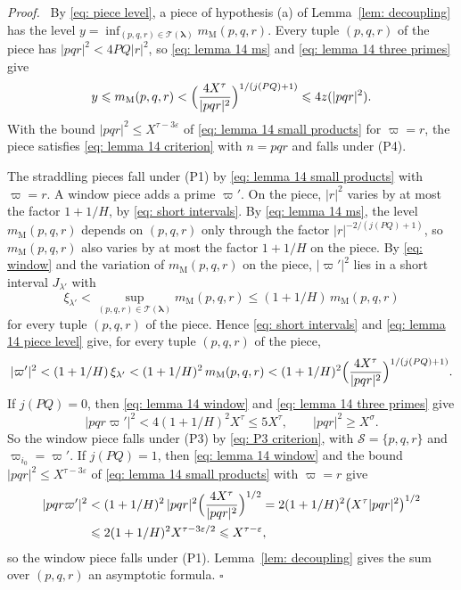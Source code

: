 \documentclass{article}
\numberwithin{equation}{section}
\newenvironment{proof}[1][Proof]{\par\medskip\noindent\textit{#1.}\ }{\hfill$\square$\par\medskip}
\newcommand{\Le}{\leqslant}
\newcommand{\Ge}{\geqslant}
\begin{document}
\begin{proof}
By \eqref{eq: piece level}, a piece of hypothesis (a) of Lemma~\ref{lem: decoupling} has the level $y = \inf_{(p, q, r) \in \mathcal{T}(\boldsymbol{\lambda})} m_{\mathrm{M}}(p, q, r)$. Every tuple $(p, q, r)$ of the piece has $|pqr|^2 < 4PQ|r|^2$, so \eqref{eq: lemma 14 ms} and \eqref{eq: lemma 14 three primes} give
\begin{equation}
\label{eq: lemma 14 piece level}
y \Le m_{\mathrm{M}}(p, q, r) < \Bigl( \frac{4X^{\tau}}{|pqr|^2} \Bigr)^{1/(j(PQ)+1)} \Le 4z(|pqr|^2).
\end{equation}
With the bound $|pqr|^2 \Le X^{\tau - 3\varepsilon}$ of \eqref{eq: lemma 14 small products} for $\varpi = r$, the piece satisfies \eqref{eq: lemma 14 criterion} with $n = pqr$ and falls under (P4).

The straddling pieces fall under (P1) by \eqref{eq: lemma 14 small products} with $\varpi = r$. A window piece adds a prime $\varpi'$. On the piece, $|r|^2$ varies by at most the factor $1 + 1/H$, by \eqref{eq: short intervals}. By \eqref{eq: lemma 14 ms}, the level $m_{\mathrm{M}}(p, q, r)$ depends on $(p, q, r)$ only through the factor $|r|^{-2/(j(PQ)+1)}$, so $m_{\mathrm{M}}(p, q, r)$ also varies by at most the factor $1 + 1/H$ on the piece. By \eqref{eq: window} and the variation of $m_{\mathrm{M}}(p, q, r)$ on the piece, $|\varpi'|^2$ lies in a short interval $J_{\lambda'}$ with
\begin{equation*}
\xi_{\lambda'} < \sup_{(p, q, r) \in \mathcal{T}(\boldsymbol{\lambda})} m_{\mathrm{M}}(p, q, r) \Le (1 + 1/H)\, m_{\mathrm{M}}(p, q, r)
\end{equation*}
for every tuple $(p, q, r)$ of the piece. Hence \eqref{eq: short intervals} and \eqref{eq: lemma 14 piece level} give, for every tuple $(p, q, r)$ of the piece,
\begin{equation}
\label{eq: lemma 14 window}
|\varpi'|^2 < (1 + 1/H)\, \xi_{\lambda'} < (1 + 1/H)^2\, m_{\mathrm{M}}(p, q, r) < (1 + 1/H)^2 \Bigl( \frac{4X^{\tau}}{|pqr|^2} \Bigr)^{1/(j(PQ)+1)}.
\end{equation}
If $j(PQ) = 0$, then \eqref{eq: lemma 14 window} and \eqref{eq: lemma 14 three primes} give
\begin{equation*}
|pqr\varpi'|^2 < 4(1 + 1/H)^2 X^{\tau} \Le 5X^{\tau}, \qquad |pqr|^2 \Ge X^{\sigma}.
\end{equation*}
So the window piece falls under (P3) by \eqref{eq: P3 criterion}, with $\mathcal{S} = \{p, q, r\}$ and $\varpi_{i_0} = \varpi'$. If $j(PQ) = 1$, then \eqref{eq: lemma 14 window} and the bound $|pqr|^2 \Le X^{\tau - 3\varepsilon}$ of \eqref{eq: lemma 14 small products} with $\varpi = r$ give
\begin{equation*}
\begin{aligned}
|pqr\varpi'|^2 &< (1 + 1/H)^2\, |pqr|^2 \Bigl( \frac{4X^{\tau}}{|pqr|^2} \Bigr)^{1/2} = 2(1 + 1/H)^2 \bigl( X^{\tau} |pqr|^2 \bigr)^{1/2} \\
&\Le 2(1 + 1/H)^2 X^{\tau - 3\varepsilon/2} \Le X^{\tau - \varepsilon},
\end{aligned}
\end{equation*}
so the window piece falls under (P1). Lemma~\ref{lem: decoupling} gives the sum over $(p, q, r)$ an asymptotic formula.
\end{proof}
\end{document}
